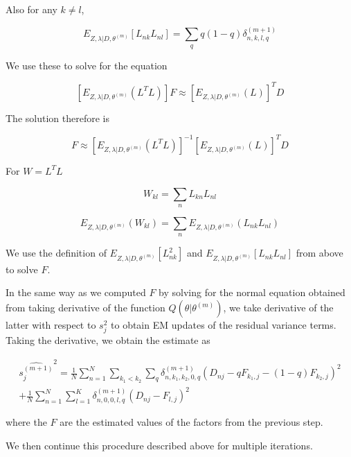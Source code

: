 \documentclass[12pt]{article}
\begin{document}
Also for any $k \neq l$,

$$ E_{ Z, \lambda | D, \theta^{(m)}} \left [ L_{nk}L_{nl} \right ] =
\sum_{q} q(1-q) \delta^{(m+1)}_{n,k,l,q} $$

We use these to solve for the equation

$$ \left [ E_{ Z, \lambda | D, \theta^{(m)}} \left( L^{T}L \right ) \right ] F \approx \left [ E_{ Z, \lambda | D, \theta^{(m)}} (L) \right] ^{T} D $$

The solution therefore is 

$$ F \approx \left [ E_{ Z, \lambda | D, \theta^{(m)}} \left( L^{T}L \right ) \right]^{-1} \left [ E_{ Z, \lambda | D, \theta^{(m)}} (L) \right]^{T} D $$

For $W = L^{T}L$

$$ W_{kl} = \sum_{n} L_{kn}L_{nl} $$

$$ E_{ Z, \lambda | D, \theta^{(m)}} \left ( W_{kl} \right ) = \sum_{n}  E_{ Z, \lambda | D, \theta^{(m)}} \left ( L_{nk}L_{nl} \right) $$

We use the definition of $E_{ Z, \lambda | D, \theta^{(m)}} \left [ L^2_{nk} \right ]$ 
and $E_{ Z, \lambda | D, \theta^{(m)}} \left [ L_{nk}L_{nl} \right ]$ 
from above to solve $F$. 

In the same way as we computed $F$ by solving for the normal equation obtained from taking derivative of the function $Q (\theta | \theta^{(m)})$, we take derivative of the latter with respect to $s^2_{j}$ to obtain EM updates of the residual variance terms. Taking the derivative, we obtain the estimate as 

\begin{multline}
\widehat{s_{j}^{(m+1)}}^2 = \frac{1}{N}\sum_{n=1}^{N} \sum_{k_1 < k_2} \sum_{q} \delta^{(m+1)}_{n, k_1, k_2, 0, q} (D_{nj} - q F_{k_1,j} - (1-q) F_{k_2,j})^2 \\
+  \frac{1}{N}\sum_{n=1}^{N} \sum_{l=1}^{K} \delta^{(m+1)}_{n, 0, 0, l, q} (D_{nj} - F_{l,j} )^2
\end{multline}

where the $F$ are the estimated values of the factors from the previous step.

We then continue this procedure described above for multiple iterations.
\end{document}

